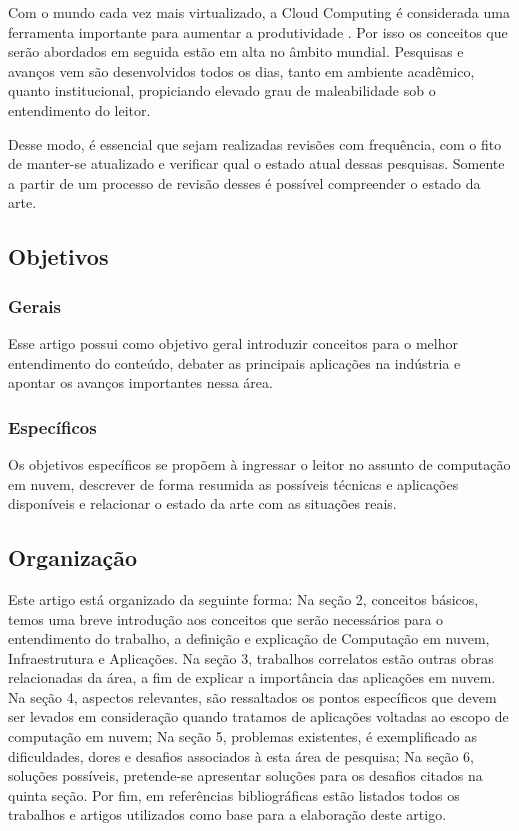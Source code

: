\documentclass[12pt]{article}
\begin{document}
Com o mundo cada vez mais virtualizado, a Cloud Computing é considerada uma ferramenta importante para aumentar a produtividade \cite{loos}. Por isso os conceitos que serão abordados em seguida estão em alta no âmbito mundial. Pesquisas e avanços vem são desenvolvidos todos os dias, tanto em ambiente acadêmico, quanto institucional, propiciando elevado grau de maleabilidade sob o entendimento do leitor.

Desse modo, é essencial que sejam realizadas revisões com frequência, com o fito de manter-se atualizado e verificar qual o estado atual dessas pesquisas. Somente a partir de um processo de revisão desses é possível compreender o estado da arte.

\subsection{Objetivos}

\subsubsection{Gerais}
Esse artigo possui como objetivo geral introduzir conceitos para o melhor entendimento do conteúdo, debater as principais aplicações na indústria e apontar os avanços importantes nessa área.

\subsubsection{Específicos}
Os objetivos específicos se propõem à ingressar o leitor no assunto de computação em nuvem, descrever de forma resumida as possíveis técnicas e aplicações disponíveis e relacionar o estado da arte com as situações reais.

\subsection{Organização}

Este artigo está organizado da seguinte forma:
Na seção 2, conceitos básicos, temos uma breve introdução aos conceitos que serão necessários para o entendimento do trabalho, a definição e explicação de Computação em nuvem, Infraestrutura e Aplicações. Na seção 3, trabalhos correlatos estão outras obras relacionadas da área, a fim de explicar a importância das aplicações em nuvem. Na seção 4, aspectos relevantes, são ressaltados os pontos específicos que devem ser levados em consideração quando tratamos de aplicações voltadas ao escopo de computação em nuvem; Na seção 5, problemas existentes, é exemplificado as dificuldades, dores e desafios associados à esta área de pesquisa; Na seção 6, soluções possíveis, pretende-se apresentar soluções para os desafios citados na quinta seção. Por fim, em referências bibliográficas estão listados todos os trabalhos e artigos utilizados como base para a elaboração deste artigo.
\end{document}

